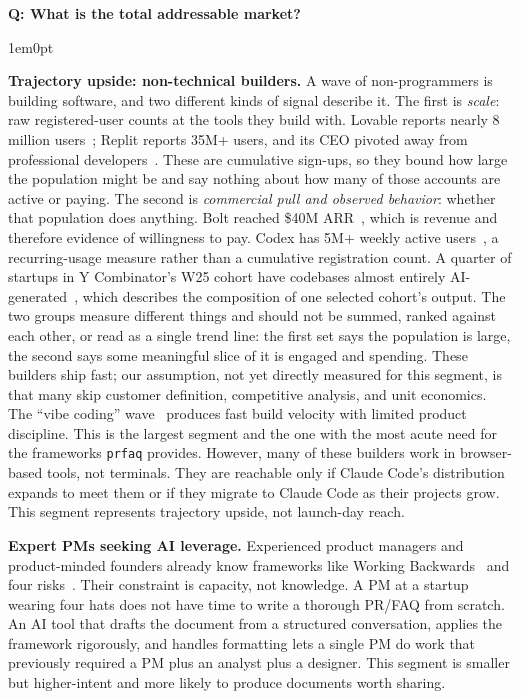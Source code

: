 \documentclass[11pt,letterpaper]{article}
\newcounter{faqnum}
\newenvironment{faqpair}[1]{%
  \needspace{4\baselineskip}%
  \vspace{0.5em}%
  \refstepcounter{faqnum}%
  \noindent\textbf{\color{SectionBlue}Q\thefaqnum: #1}\par\nopagebreak[4]%
  \vspace{0.2em}%
  \begin{adjustwidth}{1em}{0pt}%
  \setlength{\parindent}{0pt}%
}{%
  \end{adjustwidth}%
  \vspace{0.5em}%
}
\begin{document}
\begin{faqpair}{What is the total addressable market?}
  \textbf{Trajectory upside: non-technical builders.} A wave of non-programmers is building software, and two different kinds of signal describe it. The first is \textit{scale}: raw registered-user counts at the tools they build with. Lovable reports nearly 8 million users~\cite{lovable2025users}; Replit reports 35M+ users, and its CEO pivoted away from professional developers~\cite{replit2025noncoder}. These are cumulative sign-ups, so they bound how large the population might be and say nothing about how many of those accounts are active or paying. The second is \textit{commercial pull and observed behavior}: whether that population does anything. Bolt reached \$40M ARR~\cite{bolt2025revenue}, which is revenue and therefore evidence of willingness to pay. Codex has 5M+ weekly active users~\cite{openaicodex2026users}, a recurring-usage measure rather than a cumulative registration count. A quarter of startups in Y Combinator's W25 cohort have codebases almost entirely AI-generated~\cite{ycombinator2025aicode}, which describes the composition of one selected cohort's output. The two groups measure different things and should not be summed, ranked against each other, or read as a single trend line: the first set says the population is large, the second says some meaningful slice of it is engaged and spending. These builders ship fast; our assumption, not yet directly measured for this segment, is that many skip customer definition, competitive analysis, and unit economics. The ``vibe coding'' wave~\cite{karpathy2025vibecoding} produces fast build velocity with limited product discipline. This is the largest segment and the one with the most acute need for the frameworks \texttt{prfaq} provides. However, many of these builders work in browser-based tools, not terminals. They are reachable only if Claude Code's distribution expands to meet them or if they migrate to Claude Code as their projects grow. This segment represents trajectory upside, not launch-day reach.

  \textbf{Expert PMs seeking AI leverage.} Experienced product managers and product-minded founders already know frameworks like Working Backwards~\cite{bryar2021workingbackwards} and four risks~\cite{cagan2018inspired}. Their constraint is capacity, not knowledge. A PM at a startup wearing four hats does not have time to write a thorough PR/FAQ from scratch. An AI tool that drafts the document from a structured conversation, applies the framework rigorously, and handles formatting lets a single PM do work that previously required a PM plus an analyst plus a designer. This segment is smaller but higher-intent and more likely to produce documents worth sharing.


\end{faqpair}
\end{document}
